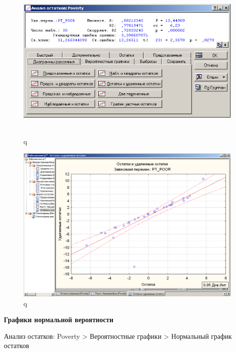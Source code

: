\begin{figure}[!h]
  \centering

  \includegraphics[height=8cm]
  {inc/example_33.PNG}

  \caption{q}

  \label{fig:example_33}
\end{figure}

\begin{figure}[!h]
  \centering

  \includegraphics[width=16cm]
  {inc/example_34.PNG}

  \caption{q}

  \label{fig:example_34}
\end{figure}

\newpage

\textbf{Графики нормальной вероятности}

Анализ остатков: Poverty > Вероятностные графики > Нормальный график остатков

